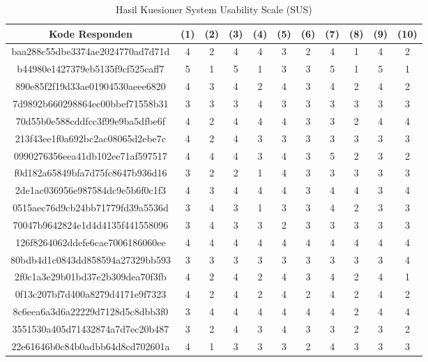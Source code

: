 \begin{longtable}{|c|c|c|c|c|c|c|c|c|c|c|}
	\caption{Hasil Kuesioner System Usability Scale (SUS)} 
	\label{table:hasil-kuesioner-sus} \\
\hline
\textbf{Kode Responden} & \textbf{(1)} & \textbf{(2)} & \textbf{(3)}  & \textbf{(4)} & \textbf{(5)} & \textbf{(6)} & \textbf{(7)} & \textbf{(8)} & \textbf{(9)} & \textbf{(10)} \\
\hline	baa288c55dbe3374ae2024770ad7d71d	&	4	&	2	&	4	&	4	&	3	&	2	&	4	&	1	&	4	&	2	\\
\hline	b44980e1427379eb5135f9cf525caff7	&	5	&	1	&	5	&	1	&	3	&	3	&	5	&	1	&	5	&	1	\\
\hline	890e85f2f19d33ae01904530aeee6820	&	4	&	3	&	4	&	2	&	4	&	3	&	4	&	2	&	4	&	2	\\
\hline	7d9892b660298864ec00bbef71558b31	&	3	&	3	&	3	&	4	&	3	&	3	&	3	&	3	&	3	&	3	\\
\hline	70d55b0e588cddfcc3f99e9ba5dfbe6f	&	4	&	2	&	4	&	4	&	4	&	3	&	3	&	2	&	4	&	4	\\
\hline	213f43ee1f0a692bc2ac08065d2ebe7c	&	4	&	2	&	4	&	3	&	3	&	3	&	3	&	3	&	3	&	3	\\
\hline	0990276356eea41db102ee71af597517	&	4	&	4	&	4	&	3	&	4	&	3	&	5	&	2	&	3	&	2	\\
\hline	f0d182a65849bfa7d75fc8647b936d16	&	3	&	2	&	2	&	1	&	4	&	3	&	3	&	3	&	3	&	3	\\
\hline	2de1ac036956e987584dc9e5b6f0c1f3	&	4	&	3	&	4	&	4	&	4	&	3	&	4	&	4	&	3	&	4	\\
\hline	0515aec76d9cb24bb71779fd39a5536d	&	3	&	4	&	3	&	1	&	3	&	3	&	4	&	2	&	3	&	3	\\
\hline	70047b9642824e1d4d4135f441558096	&	3	&	4	&	3	&	3	&	2	&	3	&	3	&	3	&	3	&	3	\\
\hline	126f8264062ddefe6cae7006186060ee	&	4	&	4	&	4	&	4	&	4	&	4	&	4	&	4	&	4	&	4	\\
\hline	80bdb4d1c0843dd858594a27329bb593	&	3	&	3	&	3	&	3	&	3	&	3	&	3	&	3	&	3	&	4	\\
\hline	2f0c1a3e29b01bd37e2b309dea70f3fb	&	4	&	2	&	4	&	2	&	4	&	3	&	4	&	2	&	4	&	1	\\
\hline	0f13c207bf7d400a8279d4171e9f7323	&	4	&	2	&	4	&	2	&	4	&	2	&	4	&	2	&	4	&	2	\\
\hline	8c6eea6a3d6a22229d7128d5c8dbb3f0	&	3	&	4	&	4	&	4	&	4	&	4	&	4	&	2	&	4	&	4	\\
\hline	3551530a405d71432874a7d7ec20b487	&	3	&	2	&	4	&	3	&	4	&	3	&	3	&	2	&	3	&	2	\\
\hline	22e61646b0c84b0adbb64d8cd702601a	&	4	&	1	&	3	&	3	&	3	&	2	&	4	&	3	&	3	&	3	\\

\end{longtable}
